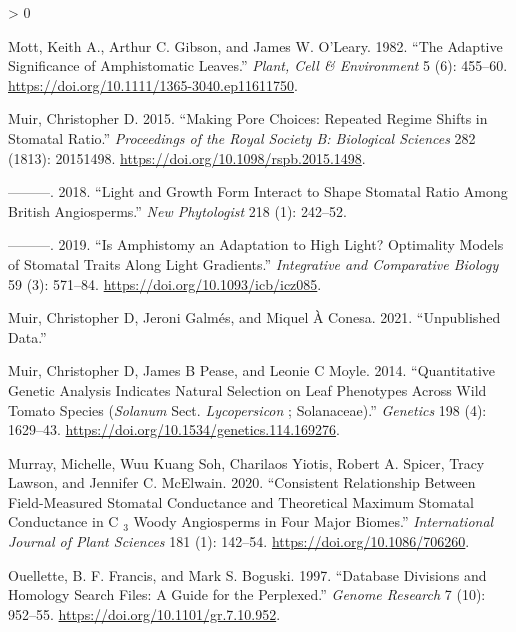 \documentclass[
  10pt,
]{article}
\newlength{\cslhangindent}
\newenvironment{CSLReferences}[2] %
 {%
  \setlength{\parindent}{0pt}
  \ifodd #1 \everypar{\setlength{\hangindent}{\cslhangindent}}\ignorespaces\fi
  \ifnum #2 > 0
  \setlength{\parskip}{#2\baselineskip}
  \fi
 }%
 {}
\begin{document}
\begin{CSLReferences}{1}{0}
\leavevmode\hypertarget{ref-mott_adaptive_1982}{}%
Mott, Keith A., Arthur C. Gibson, and James W. O'Leary. 1982. {``The Adaptive Significance of Amphistomatic Leaves.''} \emph{Plant, Cell \& Environment} 5 (6): 455--60. \url{https://doi.org/10.1111/1365-3040.ep11611750}.

\leavevmode\hypertarget{ref-muir_making_2015}{}%
Muir, Christopher D. 2015. {``Making Pore Choices: Repeated Regime Shifts in Stomatal Ratio.''} \emph{Proceedings of the Royal Society B: Biological Sciences} 282 (1813): 20151498. \url{https://doi.org/10.1098/rspb.2015.1498}.

\leavevmode\hypertarget{ref-muir_light_2018}{}%
---------. 2018. {``Light and Growth Form Interact to Shape Stomatal Ratio Among {British} Angiosperms.''} \emph{New Phytologist} 218 (1): 242--52.

\leavevmode\hypertarget{ref-muir_is_2019}{}%
---------. 2019. {``Is {Amphistomy} an {Adaptation} to {High} {Light}? {Optimality} {Models} of {Stomatal} {Traits} Along {Light} {Gradients}.''} \emph{Integrative and Comparative Biology} 59 (3): 571--84. \url{https://doi.org/10.1093/icb/icz085}.

\leavevmode\hypertarget{ref-muir_unpublished_2021}{}%
Muir, Christopher D, Jeroni Galmés, and Miquel À Conesa. 2021. {``Unpublished Data.''}

\leavevmode\hypertarget{ref-muir_quantitative_2014}{}%
Muir, Christopher D, James B Pease, and Leonie C Moyle. 2014. {``Quantitative {Genetic} {Analysis} {Indicates} {Natural} {Selection} on {Leaf} {Phenotypes} {Across} {Wild} {Tomato} {Species} (\emph{Solanum} Sect. \emph{Lycopersicon} ; {Solanaceae}).''} \emph{Genetics} 198 (4): 1629--43. \url{https://doi.org/10.1534/genetics.114.169276}.

\leavevmode\hypertarget{ref-murray_consistent_2020}{}%
Murray, Michelle, Wuu Kuang Soh, Charilaos Yiotis, Robert A. Spicer, Tracy Lawson, and Jennifer C. McElwain. 2020. {``Consistent {Relationship} Between {Field}-{Measured} {Stomatal} {Conductance} and {Theoretical} {Maximum} {Stomatal} {Conductance} in {C} \(_{\textrm{3}}\) {Woody} {Angiosperms} in {Four} {Major} {Biomes}.''} \emph{International Journal of Plant Sciences} 181 (1): 142--54. \url{https://doi.org/10.1086/706260}.

\leavevmode\hypertarget{ref-ouellette_database_1997}{}%
Ouellette, B. F. Francis, and Mark S. Boguski. 1997. {``Database {Divisions} and {Homology} {Search} {Files}: {A} {Guide} for the {Perplexed}.''} \emph{Genome Research} 7 (10): 952--55. \url{https://doi.org/10.1101/gr.7.10.952}.


\end{CSLReferences}
\end{document}
